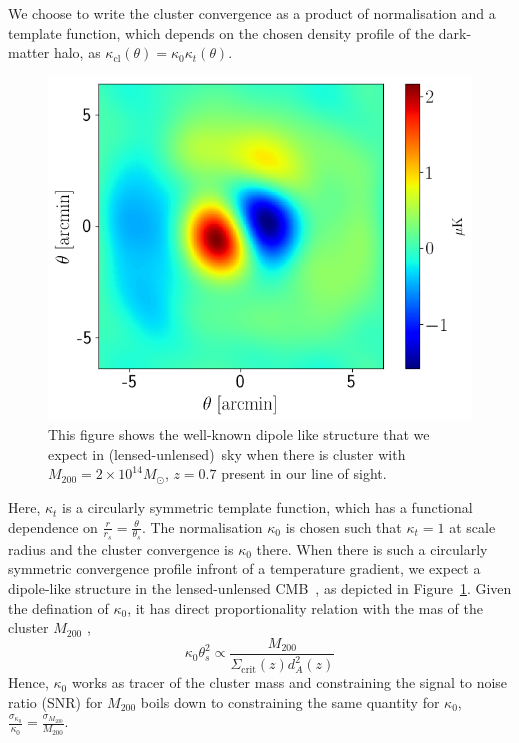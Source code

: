 \documentclass[prd, superscriptaddress, tightenlines, longbibliography, nofootinbib, eqsecnum, amsfonts, amsmath, floatfix, twocolumn, notitlepage]{revtex4-2}
\begin{document}
We choose to write the cluster convergence as a product of normalisation and a template function, which depends on the chosen density profile of the dark-matter halo, as $\kappa_{\text{cl}} (\theta) = \kappa_0 \kappa_t (\theta)$. 
\begin{figure}[H]
   \centering
   \includegraphics[width=0.85\hsize]{Figures/cluster_dipole.png}%
   \caption{This figure shows the well-known dipole like structure that we expect in (lensed-unlensed)~\protect\footnotemark[1] sky when there is cluster with $M_{200} = 2\times 10^{14} M_{\odot}$\protect\footnotemark[2], $z=0.7$ present in our line of sight.}
   \label{fig:dipole} 
\end{figure} 
Here, $\kappa_t$ is a circularly symmetric template function, which has a functional dependence on $\frac{r}{r_s}=\frac{\theta}{\theta_s}$. The normalisation $\kappa_0$ is chosen such that $\kappa_t = 1$ at scale radius and the cluster convergence is $\kappa_0$ there. When there is such a circularly  symmetric convergence profile infront of a temperature gradient, we expect a dipole-like structure in the lensed-unlensed CMB~\cite{Seljak:1999zn}, as depicted in Figure~\ref{fig:dipole}. Given the defination of $\kappa_0$, it has direct proportionality relation with the mas of the cluster $M_{200}$ \cite{Zubeldia:2019brr},
\begin{equation}\label{eq:tracer}
    \kappa_0 \theta_s^2 \propto \frac{M_{200}}{\Sigma_{\text{crit}}(z)d_{A}^2(z)}
\end{equation}
Hence, $\kappa_0$ works as tracer of the cluster mass and constraining the signal to noise ratio (SNR) for $M_{200}$ boils down to constraining the same quantity for $\kappa_0$, $\frac{\sigma_{\kappa_0}}{\kappa_0} = \frac{\sigma_{M_{200}}}{M_{200}}$. 
\end{document}
